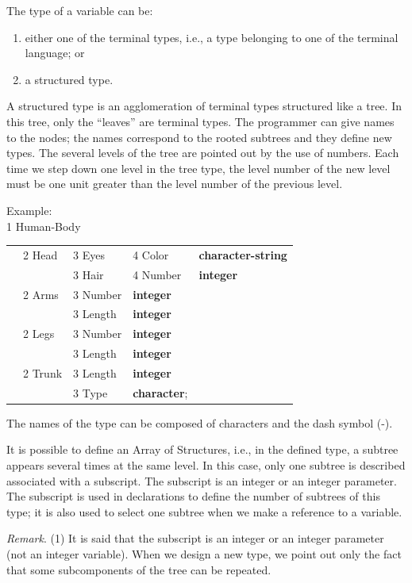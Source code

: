 \documentclass[openany,nobib]{tufte-book}
\newcommand{\kw}[1]{{\bf #1}}
\begin{document}
The type of a variable can be:
\begin{enumerate}
    \item either one of the terminal types, i.e., a type belonging to one of
the terminal language; or
    \item a structured type.
\end{enumerate}
A structured type is an agglomeration of terminal types structured like a tree.
In this tree, only the ``leaves'' are terminal types. The programmer can give
names to the nodes; the names correspond to the rooted subtrees and they define
new types. The several levels of the tree are pointed out by the use of
numbers. Each time we step down one level in the tree type, the level number of
the new level must be one unit greater than the level number of the previous
level.

\medskip

\noindent Example:\\
1 Human-Body\\
\begin{tabular}{ l l l l l }
&2 Head &3 Eyes  &4 Color&\kw{character-string} \\
&       &3 Hair  &4 Number&\kw{integer}\\
&2 Arms &3 Number&\kw{integer}\\
&       &3 Length&\kw{integer}\\
&2 Legs &3 Number&\kw{integer}\\
&       &3 Length&\kw{integer}\\
&2 Trunk&3 Length&\kw{integer}\\
&       &3 Type  &\kw{character};\\
\end{tabular}

\medskip\noindent
The names of the type can be composed of characters and the dash symbol (-).

It is possible to define an Array of Structures, i.e., in the defined type, a
subtree appears several times at the same level. In this case, only one subtree
is described associated with a subscript. The subscript is an integer or an
integer parameter. The subscript is used in declarations to define the number
of subtrees of this type; it is also used to select one subtree when we make a
reference to a variable.

{\sl Remark}. (1) It is said that the subscript is an integer or an integer
parameter (not an integer variable). When we design a new type, we point out
only the fact that some subcomponents of the tree can be repeated.
\end{document}
